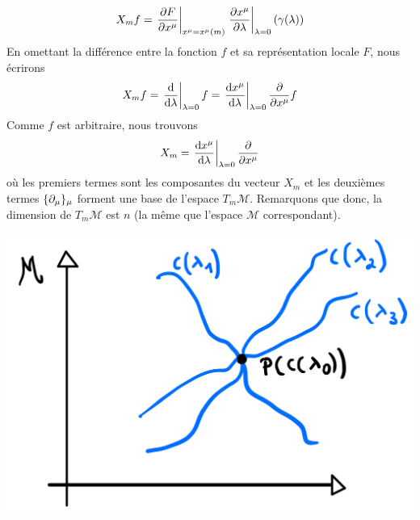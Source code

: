 \begin{align}
    X_mf = \left. \frac{\partial F}{\partial x^\mu} \right|_{x^\mu=x^\mu(m)} \left. \frac{\partial x^\mu}{\partial \lambda} \right|_{\lambda = 0} (\gamma(\lambda))
\end{align}
En omettant la différence entre la fonction $f$ et sa représentation locale $F$, nous écrirons
\begin{align}
    X_m f = \left. \frac{\mathrm{d}}{\mathrm{d} \lambda} \right|_{\lambda=0} f = \left. \frac{\mathrm{d} x^\mu}{\mathrm{d} \lambda} \right|_{\lambda = 0} \frac{\partial}{\partial x^\mu}f
\end{align}
Comme $f$ est arbitraire, nous trouvons
\begin{equation}
    X_m = \left. \frac{\mathrm{d} x^\mu}{\mathrm{d} \lambda} \right|_{\lambda = 0} \frac{\partial}{\partial x^\mu}
\end{equation}
où les premiers termes sont les composantes du vecteur $X_m$ et les deuxièmes termes $\{\partial_\mu \}_\mu$ forment une base de l'espace $T_m\mathcal{M}$. Remarquons que donc, la dimension de $T_m\mathcal{M}$ est $n$ (la même que l'espace $\mathcal{M}$ correspondant).
\begin{center}
\includegraphics[scale=0.1]{Chapitres/3.Element de géométrie différentielle/Images/vecteurs2.0.jpg}
\end{center}


